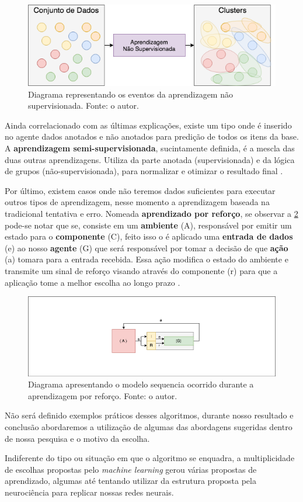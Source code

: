 \begin{figure}[H]
    \centering
    \includegraphics[width=.8\textwidth]{imagens/unsupervised.png}
    \caption{Diagrama representando os eventos da aprendizagem não supervisionada. Fonte: o autor.}
    \label{fig:unsupervised}
\end{figure}

Ainda correlacionado com as últimas explicações, existe um tipo onde é inserido no agente dados anotados e não anotados para predição de todos os itens da base. A \textbf{aprendizagem semi-supervisionada}, sucintamente definida, é a mescla das duas outras aprendizagens. Utiliza da parte anotada (supervisionada) e da lógica de grupos (não-supervisionada), para normalizar e otimizar o resultado final \cite[7]{mohri2012foundations}.

Por último, existem casos onde não teremos dados suficientes para executar outros tipos de aprendizagem, nesse momento a aprendizagem baseada na tradicional tentativa e erro. Nomeada \textbf{aprendizado por reforço}, se observar a \ref{fig:reinforcement} pode-se notar que se, consiste em um \textbf{ambiente} (A), responsável por emitir um estado para o \textbf{componente} (C), feito isso o é aplicado uma \textbf{entrada de dados} (e) ao nosso \textbf{agente} (G) que será responsável por tomar a decisão de que \textbf{ação} (a) tomara para a entrada recebida. Essa ação modifica o estado do ambiente e transmite um sinal de reforço visando através do componente (r) para que a aplicação tome a melhor escolha ao longo prazo \cite{kaelbling1996reinforcement, russell2003artificial}.

\begin{figure}[H]
    \centering
    \includegraphics[width=.8\textwidth]{imagens/reinforcement.png}
    \caption{Diagrama apresentando o modelo sequencia ocorrido durante a aprendizagem por reforço. Fonte: o autor.}
    \label{fig:reinforcement}
\end{figure}

Não será definido exemplos práticos desses algoritmos, durante nosso resultado e conclusão abordaremos a utilização de algumas das abordagens sugeridas dentro de nossa pesquisa e o motivo da escolha.

Indiferente do tipo ou situação em que o algoritmo se enquadra, a multiplicidade de escolhas propostas pelo \textit{machine learning} gerou várias propostas de aprendizado, algumas até tentando utilizar da estrutura proposta pela neurociência para replicar nossas redes neurais.
